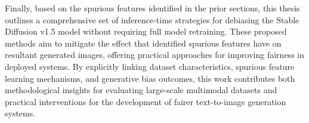 Finally, based on the spurious features identified in the prior sections, this thesis outlines a comprehensive set of inference-time strategies for debiasing the Stable Diffusion v1.5 model without requiring full model retraining. These proposed methods aim to mitigate the effect that identified spurious features have on resultant generated images, offering practical approaches for improving fairness in deployed systems. By explicitly linking dataset characteristics, spurious feature learning mechanisms, and generative bias outcomes, this work contributes both methodological insights for evaluating large-scale multimodal datasets and practical interventions for the development of fairer text-to-image generation systems.

